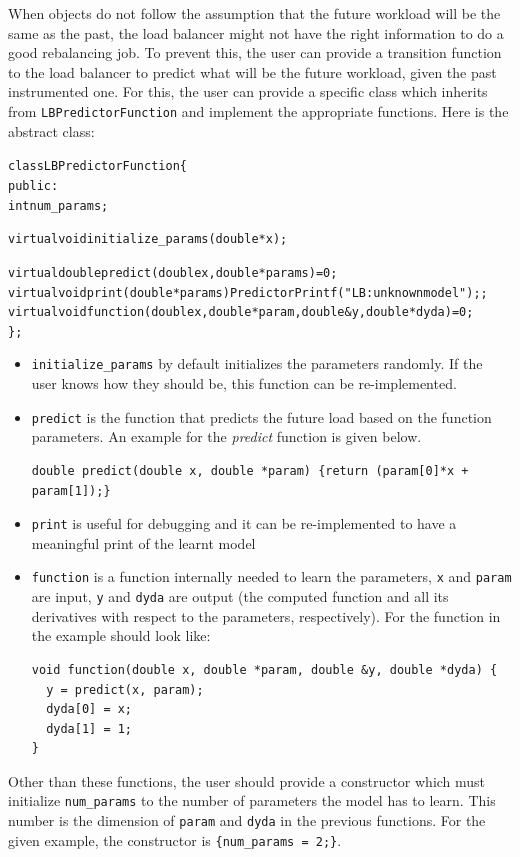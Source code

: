 When objects do not follow the assumption that the future workload will be the
same as the past, the load balancer might not have the right information to do
a good rebalancing job. To prevent this, the user can provide a transition
function to the load balancer to predict what will be the future workload, given
the past instrumented one. For this, the user can provide a specific class
which inherits from {\tt LBPredictorFunction} and implement the appropriate functions. 
Here is the abstract class:
\begin{alltt}
class LBPredictorFunction \{
public:
  int num_params;
 
  virtual void initialize_params(double *x);

  virtual double predict(double x, double *params) =0;
  virtual void print(double *params) {PredictorPrintf("LB: unknown model");};
  virtual void function(double x, double *param, double &y, double *dyda) =0;
\};
\end{alltt}
\begin{itemize}
\item {\tt initialize\_params} by default initializes the parameters randomly. If the user
knows how they should be, this function can be re-implemented.
\item {\tt predict} is the function that predicts the future load based on the function parameters.
An example for the {\em predict} function is given below.
\begin{verbatim}
double predict(double x, double *param) {return (param[0]*x + param[1]);}
\end{verbatim}
\item {\tt print} is useful for debugging and it can be re-implemented to have a meaningful
print of the learnt model
\item {\tt function} is a function internally needed to learn the parameters, {\tt x} and
{\tt param} are input, {\tt y} and {\tt dyda} are output (the computed function and
all its derivatives with respect to the parameters, respectively).
For the function in the example should look like:
\begin{verbatim}
void function(double x, double *param, double &y, double *dyda) {
  y = predict(x, param);
  dyda[0] = x;
  dyda[1] = 1;
}
\end{verbatim}
\end{itemize}
Other than these functions, the user should provide a constructor which must initialize
{\tt num\_params} to the number of parameters the model has to learn. This number is
the dimension of {\tt param} and {\tt dyda} in the previous functions. For the given
example, the constructor is {\tt \{num\_params = 2;\}}.

